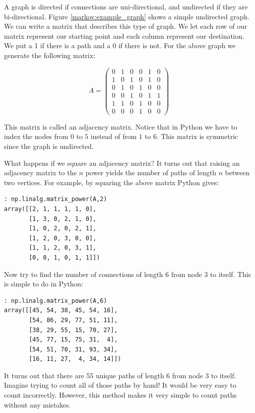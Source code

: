 A graph is directed if connections are uni-directional, and undirected if they are bi-directional.
Figure \ref{markov:example_graph} shows a simple undirected graph.
We can write a matrix that describes this type of graph.
We let each row of our matrix represent our starting point and each column represent our destination.
We put a 1 if there is a path and a 0 if there is not.
For the above graph we generate the following matrix:

\[
A = \begin{pmatrix}
0 & 1 & 0 & 0 & 1 & 0\\
1 & 0 & 1 & 0 & 1 & 0\\
0 & 1 & 0 & 1 & 0 & 0\\
0 & 0 & 1 & 0 & 1 & 1\\
1 & 1 & 0 & 1 & 0 & 0\\
0 & 0 & 0 & 1 & 0 & 0
\end{pmatrix}
\]

This matrix is called an adjacency matrix.
Notice that in Python we have to index the nodes from $0$ to $5$ instead of from $1$ to $6$.
This matrix is symmetric since the graph is undirected.

What happens if we square an adjacency matrix?
It turns out that raising an adjacency matrix to the $n$ power yields the number of paths of length $n$ between two vertices.
For example, by squaring the above matrix Python gives:
\begin{lstlisting}[style=python]
: np.linalg.matrix_power(A,2)
array([[2, 1, 1, 1, 1, 0],
       [1, 3, 0, 2, 1, 0],
       [1, 0, 2, 0, 2, 1],
       [1, 2, 0, 3, 0, 0],
       [1, 1, 2, 0, 3, 1],
       [0, 0, 1, 0, 1, 1]])
\end{lstlisting}

Now try to find the number of connections of length 6 from node 3 to itself.
This is simple to do in Python:
\begin{lstlisting}[style=python]
: np.linalg.matrix_power(A,6)
array([[45, 54, 38, 45, 54, 16],
       [54, 86, 29, 77, 51, 11],
       [38, 29, 55, 15, 70, 27],
       [45, 77, 15, 75, 31,  4],
       [54, 51, 70, 31, 93, 34],
       [16, 11, 27,  4, 34, 14]])
\end{lstlisting}
It turns out that there are 55 unique paths of length 6 from node 3 to itself.
Imagine trying to count all of those paths by hand!
It would be very easy to count incorrectly.
However, this method makes it very simple to count paths without any mistakes.

